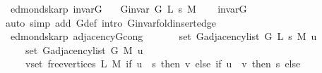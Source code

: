 \begin{isabellebody}
%
\isadeliminvisible
\isanewline
%
\endisadeliminvisible
%
\isataginvisible
{}\isamarkupfalse%
\ {\isacharparenleft}{\kern0pt}\ edmonds{\isacharunderscore}{\kern0pt}karp{\isacharparenright}{\kern0pt}\ invar{\isacharunderscore}{\kern0pt}G{}{\isacharunderscore}{\kern0pt}{}{\isacharcolon}{\kern0pt}\isanewline
\ \ \ {\isachardoublequoteopen}G{\isachardot}{\kern0pt}invar\ {\isacharparenleft}{\kern0pt}G{}{\isacharunderscore}{\kern0pt}{}\ L\ s\ M{\isacharparenright}{\kern0pt}{\isachardoublequoteclose}%
\endisataginvisible
{\isafoldinvisible}%
%
\isadeliminvisible
\isanewline
%
\endisadeliminvisible
%
\isadelimproof
\ \ %
\endisadelimproof
%
\isatagproof
{}\isamarkupfalse%
\ invar{\isacharunderscore}{\kern0pt}G{}{\isacharunderscore}{\kern0pt}{}\isanewline
\ \ \isamarkupfalse%
\ {\isacharparenleft}{\kern0pt}auto\ simp\ add{\isacharcolon}{\kern0pt}\ G{}{\isacharunderscore}{\kern0pt}{}{\isacharunderscore}{\kern0pt}def\ intro{\isacharcolon}{\kern0pt}\ G{\isachardot}{\kern0pt}invar{\isacharunderscore}{\kern0pt}fold{\isacharunderscore}{\kern0pt}insert{\isacharunderscore}{\kern0pt}edge{\isacharparenright}{\kern0pt}%
\endisatagproof
{\isafoldproof}%
%
\isadelimproof
\isanewline
%
\endisadelimproof
%
\isadeliminvisible
\isanewline
%
\endisadeliminvisible
%
\isataginvisible
{}\isamarkupfalse%
\ {\isacharparenleft}{\kern0pt}\ edmonds{\isacharunderscore}{\kern0pt}karp{\isacharparenright}{\kern0pt}\ adjacency{\isacharunderscore}{\kern0pt}G{}{\isacharunderscore}{\kern0pt}{}{\isacharunderscore}{\kern0pt}cong{\isacharcolon}{\kern0pt}\isanewline
\ \ \isanewline
\ \ \ \ {\isachardoublequoteopen}set\ {\isacharparenleft}{\kern0pt}G{\isachardot}{\kern0pt}adjacency{\isacharunderscore}{\kern0pt}list\ {\isacharparenleft}{\kern0pt}G{}{\isacharunderscore}{\kern0pt}{}\ L\ s\ M{\isacharparenright}{\kern0pt}\ u{\isacharparenright}{\kern0pt}\ {\isacharequal}{\kern0pt}\isanewline
\ \ \ \ \ set\ {\isacharparenleft}{\kern0pt}G{\isachardot}{\kern0pt}adjacency{\isacharunderscore}{\kern0pt}list\ {\isacharparenleft}{\kern0pt}G{}{\isacharunderscore}{\kern0pt}{}\ M{\isacharparenright}{\kern0pt}\ u{\isacharparenright}{\kern0pt}\ {\isasymunion}\isanewline
\ \ \ \ \ {\isacharparenleft}{\kern0pt}{\isasymUnion}v{\isasymin}set\ {\isacharparenleft}{\kern0pt}free{\isacharunderscore}{\kern0pt}vertices\ L\ M{\isacharparenright}{\kern0pt}{\isachardot}{\kern0pt}\ if\ u\ {\isacharequal}{\kern0pt}\ s\ then\ {\isacharbraceleft}{\kern0pt}v{\isacharbraceright}{\kern0pt}\ else\ if\ u\ {\isacharequal}{\kern0pt}\ v\ then\ {\isacharbraceleft}{\kern0pt}s{\isacharbraceright}{\kern0pt}\ else\ {\isacharbraceleft}{\kern0pt}{\isacharbraceright}{\kern0pt}{\isacharparenright}{\kern0pt}{\isachardoublequoteclose}%

\end{isabellebody}
